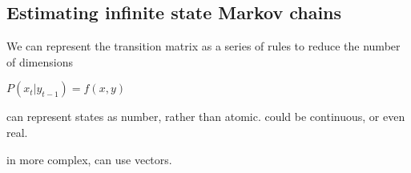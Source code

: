 
\subsection{Estimating infinite state Markov chains}

We can represent the transition matrix as a series of rules to reduce the number of dimensions

\(P(x_t |y_{t-1})=f(x,y)\)



can represent states as number, rather than atomic. could be continuous, or even real.

in more complex, can use vectors.
